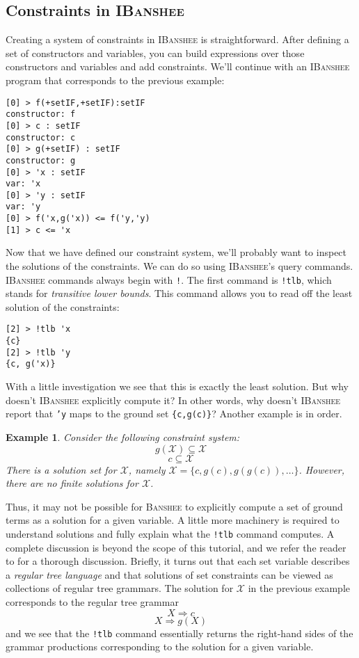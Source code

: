 \documentclass{article}
\newcommand{\banshee}{\textsc{Banshee}}
\newcommand{\ibanshee}{\textsc{IBanshee}}
\newcommand{\var}[1]{\mathcal{#1}}
\newtheorem{example}{Example}
\begin{document}
\subsection{Constraints in \ibanshee{}}

Creating a system of constraints in \ibanshee{} is
straightforward. After defining a set of constructors and variables,
you can build expressions over those constructors and variables and
add constraints. We'll continue with an \ibanshee{} program that
corresponds to the previous example:

\begin{verbatim}
[0] > f(+setIF,+setIF):setIF
constructor: f
[0] > c : setIF
constructor: c
[0] > g(+setIF) : setIF
constructor: g
[0] > 'x : setIF
var: 'x
[0] > 'y : setIF
var: 'y
[0] > f('x,g('x)) <= f('y,'y)
[1] > c <= 'x
\end{verbatim}

Now that we have defined our constraint system, we'll probably want to
inspect the solutions of the constraints. We can do so using
\ibanshee{}'s query commands. \ibanshee{} commands always begin with
\texttt{!}. The first command is \texttt{!tlb}, which stands for
\emph{transitive lower bounds}. This command allows you to read off
the least solution of the constraints:

\begin{verbatim}
[2] > !tlb 'x
{c}
[2] > !tlb 'y
{c, g('x)}
\end{verbatim}

With a little investigation we see that this is exactly the least
solution. But why doesn't \ibanshee{} explicitly compute it? In other
words, why doesn't \ibanshee{} report that \texttt{'y} maps to the
ground set \texttt{\{c,g(c)\}}? Another example is in order. 

\begin{example}
Consider the following constraint system: 
\[
g(\var{X}) \subseteq \var{X}
\]
\[
c \subseteq \var{X}
\]
There is a solution set for $\var{X}$, namely $\var{X} = \{c, g(c),
g(g(c)),\ldots\}$. However, there are no finite solutions for
$\var{X}$.
\end{example}

Thus, it may not be possible for \banshee{} to explicitly compute a
set of ground terms as a solution for a given variable. A little more
machinery is required to understand solutions and fully explain what
the \texttt{!tlb} command computes. A complete discussion is beyond
the scope of this tutorial, and we refer the reader to
\cite{heintze:thesis} for a thorough discussion. Briefly, it turns out
that each set variable describes a \emph{regular tree language} and
that solutions of set constraints can be viewed as collections of
regular tree grammars. The solution for $\var{X}$ in the previous
example corresponds to the regular tree grammar
\[
X \Rightarrow c
\]
\[
X \Rightarrow g(X)
\]
and we see that the \texttt{!tlb} command essentially returns the
right-hand sides of the grammar productions corresponding to the
solution for a given variable.
\end{document}
